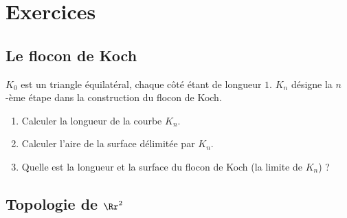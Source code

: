 \documentclass[11pt,class=report,crop=false]{standalone}
\begin{document}
\section{Exercices}


\subsection{Le flocon de Koch}

\begin{exercicecours}
$K_0$ est un triangle équilatéral, chaque côté étant de longueur $1$.
$K_n$ désigne la $n$-ème étape dans la construction du flocon de Koch. 
\begin{enumerate}
 \item Calculer la longueur de la courbe $K_n$.
 \item Calculer l'aire de la surface délimitée par $K_n$.
 \item Quelle est la longueur et la surface du flocon de Koch (la limite de $K_n$) ?
\end{enumerate}

\end{exercicecours}


\subsection{Topologie de $\Rr^2$}
\end{document}
